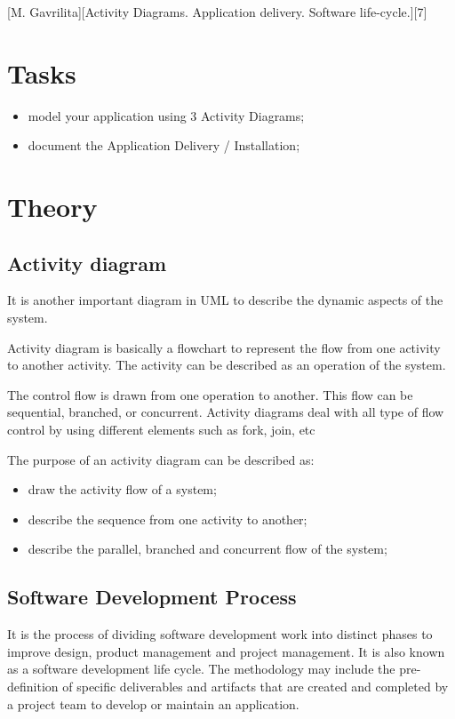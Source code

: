 \documentclass{article}
\begin{document}
	[M. Gavrilita][Activity Diagrams. Application delivery. Software life-cycle.][7]

	\section{Tasks}
		\begin{itemize}
			\item model your application using 3 Activity Diagrams;
			\item document the Application Delivery / Installation;
		\end{itemize}

	\section{Theory}
		\subsection{Activity diagram}
			It is another important diagram in UML to describe the dynamic aspects of the system.

			Activity diagram is basically a flowchart to represent the flow from one activity to another activity. The activity can be described as an operation of the system.

			The control flow is drawn from one operation to another. This flow can be sequential, branched, or concurrent. Activity diagrams deal with all type of flow control by using different elements such as fork, join, etc

			\bigskip
			The purpose of an activity diagram can be described as:
			\begin{itemize}
				\item draw the activity flow of a system;
				\item describe the sequence from one activity to another;
				\item describe the parallel, branched and concurrent flow of the system;
			\end{itemize}

		\subsection{Software Development Process}
			It is the process of dividing software development work into distinct phases to improve design, product management and project management. It is also known as a software development life cycle. The methodology may include the pre-definition of specific deliverables and artifacts that are created and completed by a project team to develop or maintain an application.
\end{document}
